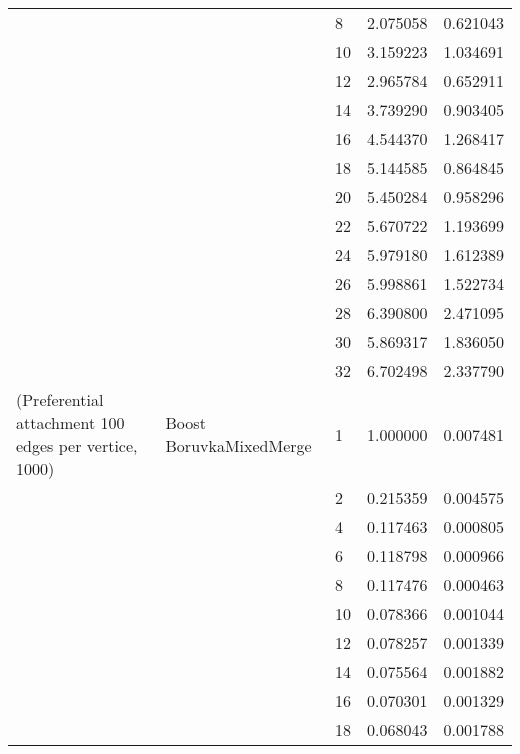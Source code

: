 \begin{tabular}{lllrr}
                      &                     & 8  &  2.075058 &  0.621043 \\
                      &                     & 10 &  3.159223 &  1.034691 \\
                      &                     & 12 &  2.965784 &  0.652911 \\
                      &                     & 14 &  3.739290 &  0.903405 \\
                      &                     & 16 &  4.544370 &  1.268417 \\
                      &                     & 18 &  5.144585 &  0.864845 \\
                      &                     & 20 &  5.450284 &  0.958296 \\
                      &                     & 22 &  5.670722 &  1.193699 \\
                      &                     & 24 &  5.979180 &  1.612389 \\
                      &                     & 26 &  5.998861 &  1.522734 \\
                      &                     & 28 &  6.390800 &  2.471095 \\
                      &                     & 30 &  5.869317 &  1.836050 \\
                      &                     & 32 &  6.702498 &  2.337790 \\
(Preferential attachment 100 edges per vertice, 1000) & Boost BoruvkaMixedMerge & 1  &  1.000000 &  0.007481 \\
                      &                     & 2  &  0.215359 &  0.004575 \\
                      &                     & 4  &  0.117463 &  0.000805 \\
                      &                     & 6  &  0.118798 &  0.000966 \\
                      &                     & 8  &  0.117476 &  0.000463 \\
                      &                     & 10 &  0.078366 &  0.001044 \\
                      &                     & 12 &  0.078257 &  0.001339 \\
                      &                     & 14 &  0.075564 &  0.001882 \\
                      &                     & 16 &  0.070301 &  0.001329 \\
                      &                     & 18 &  0.068043 &  0.001788 \\

\end{tabular}
